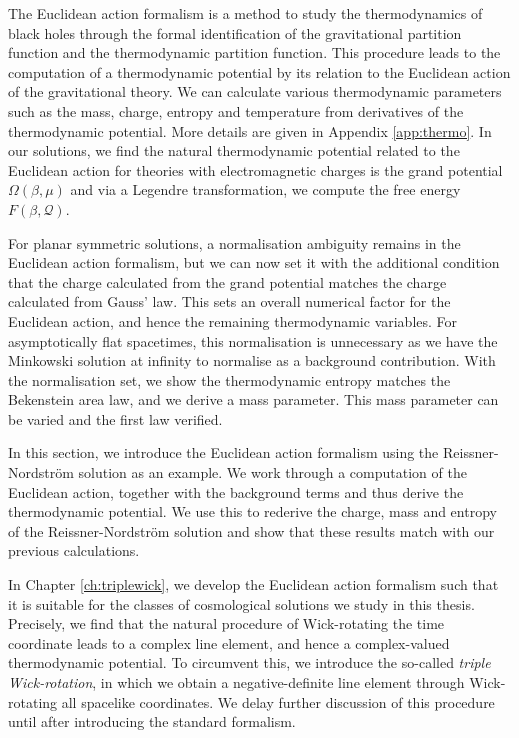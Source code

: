 The Euclidean action formalism \cite{Gibbons:1976ue, Gibbons:1977mu} is a method to study the thermodynamics of black holes through the formal identification of the gravitational partition function and the thermodynamic partition function. This procedure leads to the computation of a thermodynamic potential by its relation to the Euclidean action of the gravitational theory. We can calculate various thermodynamic parameters such as the mass, charge, entropy and temperature from derivatives of the thermodynamic potential. More details are given in Appendix \ref{app:thermo}. In our solutions, we find the natural thermodynamic potential related to the Euclidean action for theories with electromagnetic charges is the grand potential $\Omega(\beta, \mu)$ and via a Legendre transformation, we compute the free energy $F(\beta, \mathcal{Q})$.

For planar symmetric solutions, a normalisation ambiguity remains in the Euclidean action formalism, but we can now set it with the additional condition that the charge calculated from the grand potential matches the charge calculated from Gauss' law. This sets an overall numerical factor for the Euclidean action, and hence the remaining thermodynamic variables. For asymptotically flat spacetimes, this normalisation is unnecessary as we have the Minkowski solution at infinity to normalise as a background contribution. With the normalisation set, we show the thermodynamic entropy matches the Bekenstein area law, and we derive a mass parameter. This mass parameter can be varied and the first law verified.

In this section, we introduce the Euclidean action formalism using the Reissner-Nordstr\"om solution as an example. We work through a computation of the Euclidean action, together with the background terms and thus derive the thermodynamic potential. We use this to rederive the charge, mass and entropy of the Reissner-Nordstr\"om solution and show that these results match with our previous calculations. 

In Chapter \ref{ch:triplewick}, we develop the Euclidean action formalism such that it is suitable for the classes of cosmological solutions we study in this thesis. Precisely, we find that the natural procedure of Wick-rotating the time coordinate leads to a complex line element, and hence a complex-valued thermodynamic potential. To circumvent this, we introduce the so-called \emph{triple Wick-rotation}, in which we obtain a negative-definite line element through Wick-rotating all spacelike coordinates. We delay further discussion of this procedure until after introducing the standard formalism.


